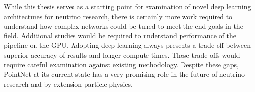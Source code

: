 While this thesis serves as a starting point for examination of novel deep learning architectures for neutrino research, there is certainly more work required to understand how complex networks could be tuned to meet the end goals in the field. Additional studies would be required to understand performance of the pipeline on the GPU. Adopting deep learning always presents a trade-off between superior accuracy of results and longer compute times. These trade-offs would require careful examination against existing methodology. Despite these gaps, PointNet at its current state has a very promising role in the future of neutrino research and by extension particle physics.

\let\cleardoublepage\clearpage



